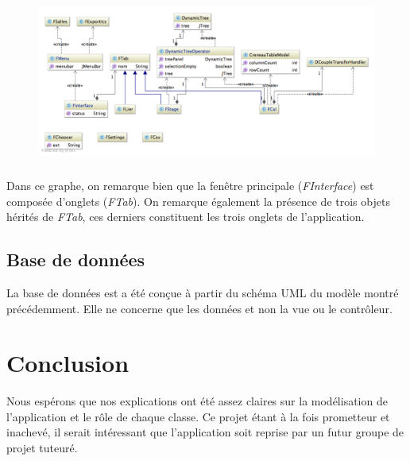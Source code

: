 \documentclass[a4paper,10pt]{report}
\begin{document}
			\begin{figure}[h!]
				\includegraphics[scale=.5]{uml_fen.png}
				\centering
			\end{figure}

			\paragraph*{}
			Dans ce graphe, on remarque bien que la fenêtre principale (\textit{FInterface}) est composée d’onglets (\textit{FTab}). On remarque également la présence de trois objets hérités de \textit{FTab}, ces derniers constituent les trois onglets de l'application.

	\section{Base de données}

		La base de données est a été conçue à partir du schéma UML du modèle montré précédemment. Elle ne concerne que les données et non la vue ou le contrôleur.

\chapter*{Conclusion}

Nous espérons que nos explications ont été assez claires sur la modélisation de l'application et le rôle de chaque classe. 
Ce projet étant à la fois prometteur et inachevé, il serait intéressant que l'application soit reprise par un futur groupe de projet tuteuré.
\end{document}
